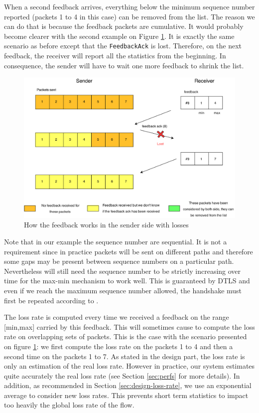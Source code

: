 When a second feedback arrives, everything below the minimum sequence number reported (packets 1 to 4 in this case) can be removed from the list. The reason we can do that is because the feedback packets are cumulative. It would probably become clearer with the second example on Figure \ref{fig:feedback-imp2}. It is exactly the same scenario as before except that the \texttt{FeedbackAck} is lost. Therefore, on the next feedback, the receiver will report all the statistics from the beginning. In consequence, the sender will have to wait one more feedback to shrink the list.

\begin{figure}[!ht]
\centering
\includegraphics[width=\textwidth]{images/Feedback-implem2.eps}
\caption{How the feedback works in the sender side with losses}
\label{fig:feedback-imp2}
\end{figure}

Note that in our example the sequence number are sequential. It is not a requirement since in practice packets will be sent on different paths and therefore some gaps may be present between sequence numbers on a particular path. Nevertheless will still need the sequence number to be strictly increasing over time for the max-min mechanism to work well. This is guaranteed by DTLS and even if we reach the maximum sequence number allowed, the handshake must first be repeated according to \cite{RFC5246}.

The loss rate is computed every time we received a feedback on the range [min,max] carried by this feedback. This will sometimes cause to compute the loss rate on overlapping sets of packets. This is the case with the scenario presented on figure \ref{fig:feedback-imp2}: we first compute the loss rate on the packets 1 to 4 and then a second time on the packets 1 to 7. As stated in the design part, the loss rate is only an estimation of the real loss rate. However in practice, our system estimates quite accurately the real loss rate (see Section \ref{sec:perfs} for more details). In addition, as recommended in Section \ref{sec:design-loss-rate}, we use an exponential average to consider new loss rates. This prevents short term statistics to impact too heavily the global loss rate of the flow.

